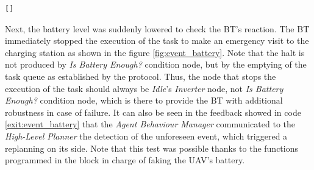 \begin{lstlisting}[caption={Printed feedback messages after an arrival of a task with a repeated id. \emph{Tool Delivery} task overwrites \emph{Tool Delivery} task}, breaklines=true, label=exit:event_DuplicatedID]
	[]
\end{lstlisting}

Next, the battery level was suddenly lowered to check the \gls{BT}'s reaction. The \gls{BT} immediately stopped the execution of the task to make an emergency visit to the charging station as shown in the figure \ref{fig:event_battery}. Note that the halt is not produced by \emph{Is Battery Enough?} condition node, but by the emptying of the task queue as established by the protocol. Thus, the node that stops the execution of the task should always be \emph{Idle}'s \emph{Inverter} node, not \emph{Is Battery Enough?} condition node, which is there to provide the \gls{BT} with additional robustness in case of failure. It can also be seen in the feedback showed in code \ref{exit:event_battery} that the \emph{Agent Behaviour Manager} communicated to the \emph{High-Level Planner} the detection of the unforeseen event, which triggered a replanning on its side. Note that this test was possible thanks to the functions programmed in the block in charge of faking the \gls{UAV}'s battery.

